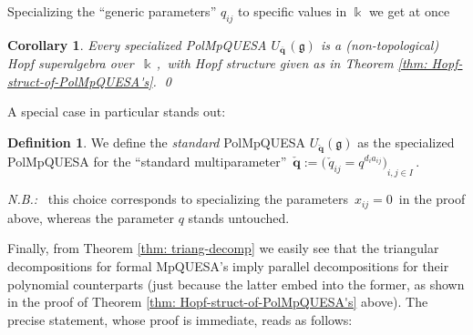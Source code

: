 \documentclass[12pt,reqno,twoside,a4paper]{amsart}
\numberwithin{equation}{section}
\newtheorem{cor}[lema]{Corollary}
\theoremstyle{definition}
\newtheorem{definition}[lema]{Definition}
\newtheorem{free text}[lema]{}
\theoremstyle{remark}
\newcommand{\com}{\Delta}
\def \bq {\mathbf{q}}
\def \k {\Bbbk}
\def \SS {\mathcal{S}}
\def \lieg{\mathfrak{g}}
\theoremstyle{plain}
\begin{document}
\vskip7pt

   Specializing the ``generic parameters''  $ q_{ij} $
   to specific values in  $ \k $  we get at once

\vskip11pt

\begin{cor}  \label{thm: Hopf-struct-of-special-PolMpQUESA's}
%
 Every  \textsl{specialized}  PolMpQUESA  $ U_{\overline{\bq}\,}(\lieg) $
 is a (non-topological) Hopf superalgebra over  $ \, \k \, $,  \,with
%
%
 Hopf structure given as in
 Theorem \ref{thm: Hopf-struct-of-PolMpQUESA's}.   \hfill  \qed
%
\end{cor}

\vskip7pt

   A special case in particular stands out:

\vskip11pt

\begin{definition}  \label{def: stand-PolMpQUESA}
%
 We define the  \textit{standard\/}  PolMpQUESA  $ U_{\check{\bq}}(\lieg) $
 as the specialized PolMpQUESA for the ``standard multiparameter''
 $ \, \check{\bq} := {\big(\, \check{q}_{ij} = q^{d_i a_{ij}} \big)}_{i, j \in I} \, $.
                                                          \par
   \textsl{N.B.:} \,  this choice corresponds to specializing the parameters
   $ \, x_{ij} = 0 \, $  in the proof above, whereas
   the parameter $ q $  stands untouched.
%
\end{definition}

\vskip7pt

   Finally, from  Theorem \ref{thm: triang-decomp}  we easily see that the
   triangular decompositions for formal MpQUESA's imply parallel decompositions for their polynomial
   counterparts (just because the latter embed into the former, as shown in the proof of
   Theorem \ref{thm: Hopf-struct-of-PolMpQUESA's}  above).
   The precise statement, whose proof is immediate, reads as follows:
\end{document}
